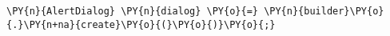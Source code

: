 \begin{Verbatim}[commandchars=\\\{\}]
\PY{n}{AlertDialog} \PY{n}{dialog} \PY{o}{=} \PY{n}{builder}\PY{o}{.}\PY{n+na}{create}\PY{o}{(}\PY{o}{)}\PY{o}{;}
\end{Verbatim}
